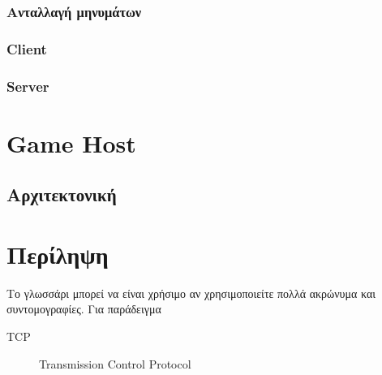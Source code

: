\documentclass[oneside, 12pt]{book}
\begin{document}
			
			
			\subsection{Ανταλλαγή μηνυμάτων}
			
			\subsection{Client}	
			
			\subsection{Server}	

	\chapter{Game Host}
	\section{Αρχιτεκτονική}		
	
	\chapter{Περίληψη}
	
	\begin{Glossary}
		Το γλωσσάρι μπορεί να είναι χρήσιμο αν χρησιμοποιείτε πολλά ακρώνυμα
		και συντομογραφίες. Για παράδειγμα
		\begin{description}
			\item[TCP]Transmission Control Protocol
		\end{description}
	\end{Glossary}
	
	\printbibliography
	
\end{document}
